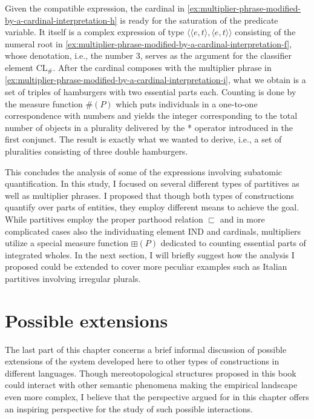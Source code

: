 	Given the compatible expression, the cardinal in \ref{ex:multiplier-phrase-modified-by-a-cardinal-interpretation-h} is ready for the saturation of the predicate variable. It itself is a complex expression of type $\langle\langle e,t\rangle,\langle e,t\rangle\rangle$ consisting of the numeral root in \ref{ex:multiplier-phrase-modified-by-a-cardinal-interpretation-f}, whose denotation, i.e., the number 3, serves as the argument for the classifier element CL$_\#$. After the cardinal composes with the multiplier phrase in \ref{ex:multiplier-phrase-modified-by-a-cardinal-interpretation-i}, what we obtain is a set of triples of hamburgers with two essential parts each. Counting is done by the measure function $\#(P)$ which puts  individuals in a one-to-one correspondence with numbers and yields the integer corresponding to the total number of objects in a plurality delivered by the * operator introduced in the first conjunct. The result is exactly what we wanted to derive, i.e., a set of pluralities consisting of three double hamburgers.
	
	This concludes the analysis of some of the expressions involving subatomic quantification. In this study, I focused on several different types of partitives as well as multiplier phrases. I proposed that though both types of constructions quantify over parts of entities, they employ different means to achieve the goal. While partitives employ the proper parthood relation $\sqsubset$ and in more complicated cases also the individuating element IND and cardinals, multipliers utilize a special measure function $\boxplus(P)$ dedicated to counting essential parts of integrated wholes. In the next section, I will briefly suggest how the analysis I proposed could be extended to cover more peculiar examples such as Italian partitives involving irregular plurals.
	
	\section{Possible extensions}\label{sec:possible-extensions}
	
	The last part of this chapter concerns a brief informal discussion of possible extensions of the system developed here to other types of constructions in different languages. Though mereotopological structures proposed in this book could interact with other semantic phenomena making the empirical landscape even more complex, I believe that the perspective argued for in this chapter offers an inspiring perspective for the study of such possible interactions. 
	

